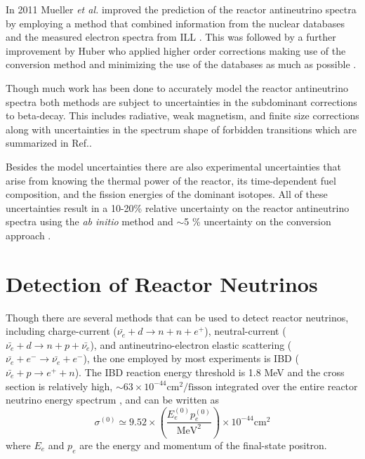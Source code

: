 In 2011 Mueller \textit{et al.} improved the prediction of the reactor antineutrino spectra by employing a method that combined information from the nuclear databases and the measured electron spectra from ILL \cite{Mueller}. 
This was followed by a further improvement by Huber who applied higher order corrections making use of the conversion method and minimizing the use of the databases as much as possible \cite{Huber}.

Though much work has been done to accurately model the reactor antineutrino spectra both methods are subject to uncertainties in the subdominant corrections to beta-decay. This includes radiative, weak magnetism, and finite size corrections along with uncertainties in the spectrum shape of forbidden transitions which are summarized in Ref.\cite{HayesVogel}. 

Besides the model uncertainties there are also experimental uncertainties that arise from knowing the thermal power of the reactor, its time-dependent fuel composition, and the fission energies of the dominant isotopes.
All of these uncertainties result in a 10-20\% relative uncertainty on the reactor antineutrino spectra using the \textit{ab initio} method and $\sim$5 \% uncertainty on the conversion approach \cite{Qian:2018wid}.



\section{Detection of Reactor Neutrinos}

Though there are several methods that can be used to detect reactor neutrinos, including charge-current ($\bar{\nu_e} + d \rightarrow n + n + e^+$), neutral-current ($\bar{\nu_e} + d \rightarrow n + p + \bar{\nu_e}$), and antineutrino-electron elastic scattering ($\bar{\nu_e} + e^- \rightarrow \bar{\nu_e} + e^-$), the one employed by most experiments is IBD ($\bar{\nu_e} + p \rightarrow e^+ + n$).
The IBD reaction energy threshold is 1.8 MeV and the cross section is relatively high, $\sim 63 \times 10^{-44} \textrm{cm}^2/\textrm{fisson}$ integrated over the entire reactor neutrino energy spectrum \cite{Qian:2018wid}, and can be written as
\begin{equation}
	\sigma^{(0)} \simeq 9.52 \times \left(\frac{E_e^{(0)}p_e^{(0)}}{\textrm{MeV}^2}\right) \times 10^{-44}\textrm{cm}^2
\end{equation}
where $E_e$ and $p_e$ are the energy and momentum of the final-state positron. 

